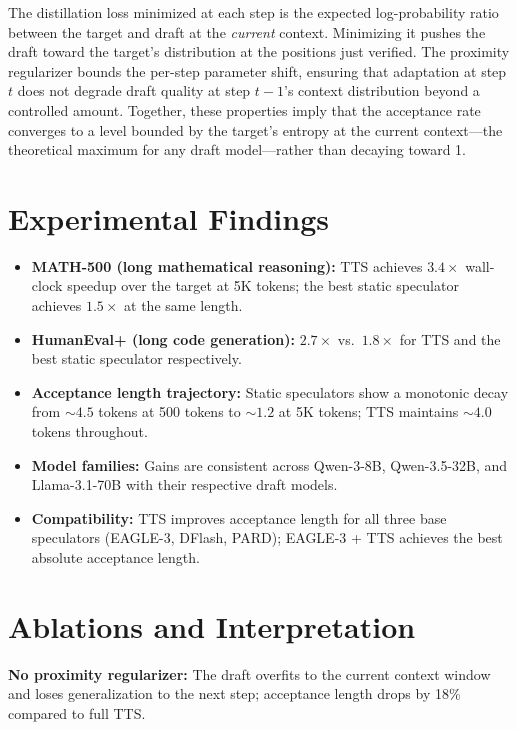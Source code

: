 \documentclass[10pt,twocolumn]{article}
\begin{document}
The distillation loss minimized at each step is the expected log-probability
ratio between the target and draft at the \emph{current} context. Minimizing
it pushes the draft toward the target's distribution at the positions just
verified. The proximity regularizer bounds the per-step parameter shift,
ensuring that adaptation at step $t$ does not degrade draft quality at step
$t-1$'s context distribution beyond a controlled amount. Together, these
properties imply that the acceptance rate converges to a level bounded by the
target's entropy at the current context---the theoretical maximum for any
draft model---rather than decaying toward 1.

\section{Experimental Findings}

\begin{itemize}[itemsep=2pt,parsep=0pt]
  \item \textbf{MATH-500 (long mathematical reasoning):} TTS achieves $3.4\times$
    wall-clock speedup over the target at 5K tokens; the best static speculator
    achieves $1.5\times$ at the same length.
  \item \textbf{HumanEval+ (long code generation):} $2.7\times$ vs.\ $1.8\times$
    for TTS and the best static speculator respectively.
  \item \textbf{Acceptance length trajectory:} Static speculators show a monotonic
    decay from $\sim 4.5$ tokens at 500 tokens to $\sim 1.2$ at 5K tokens;
    TTS maintains $\sim 4.0$ tokens throughout.
  \item \textbf{Model families:} Gains are consistent across Qwen-3-8B,
    Qwen-3.5-32B, and Llama-3.1-70B with their respective draft models.
  \item \textbf{Compatibility:} TTS improves acceptance length for all three
    base speculators (EAGLE-3, DFlash, PARD); EAGLE-3 + TTS achieves the
    best absolute acceptance length.
\end{itemize}

\section{Ablations and Interpretation}

\textbf{No proximity regularizer:}
The draft overfits to the current context window and loses generalization to
the next step; acceptance length drops by 18\% compared to full TTS.
\end{document}
